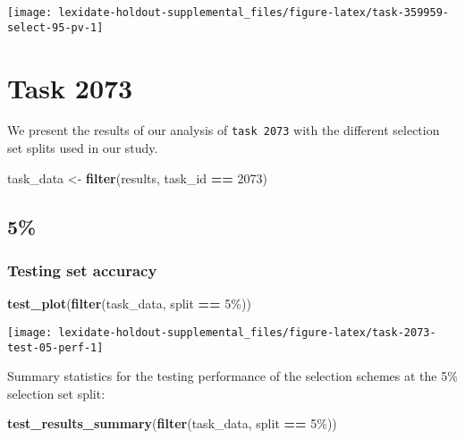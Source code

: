\documentclass[
]{book}
\newenvironment{Shaded}{\begin{snugshade}}{\end{snugshade}}
\newcommand{\DecValTok}[1]{\textcolor[rgb]{0.00,0.00,0.81}{#1}}
\newcommand{\FunctionTok}[1]{\textcolor[rgb]{0.13,0.29,0.53}{\textbf{#1}}}
\newcommand{\NormalTok}[1]{#1}
\newcommand{\OtherTok}[1]{\textcolor[rgb]{0.56,0.35,0.01}{#1}}
\newcommand{\SpecialCharTok}[1]{\textcolor[rgb]{0.81,0.36,0.00}{\textbf{#1}}}
\newcommand{\StringTok}[1]{\textcolor[rgb]{0.31,0.60,0.02}{#1}}
\begin{document}
\texttt{[image: lexidate-holdout-supplemental\_files/figure-latex/task-359959-select-95-pv-1]}

\hypertarget{task-2073}{%
\chapter{Task 2073}\label{task-2073}}

We present the results of our analysis of \texttt{task\ 2073} with the different selection set splits used in our study.

\begin{Shaded}
\begin{Highlighting}[]
\NormalTok{task\_data }\OtherTok{\textless{}{-}} \FunctionTok{filter}\NormalTok{(results, task\_id }\SpecialCharTok{==} \DecValTok{2073}\NormalTok{)}
\end{Highlighting}
\end{Shaded}

\hypertarget{section-40}{%
\section{5\%}\label{section-40}}

\hypertarget{testing-set-accuracy-40}{%
\subsection{Testing set accuracy}\label{testing-set-accuracy-40}}

\begin{Shaded}
\begin{Highlighting}[]
\FunctionTok{test\_plot}\NormalTok{(}\FunctionTok{filter}\NormalTok{(task\_data, split }\SpecialCharTok{==} \StringTok{\textquotesingle{}5\%\textquotesingle{}}\NormalTok{))}
\end{Highlighting}
\end{Shaded}

\texttt{[image: lexidate-holdout-supplemental\_files/figure-latex/task-2073-test-05-perf-1]}

Summary statistics for the testing performance of the selection schemes at the 5\% selection set split:

\begin{Shaded}
\begin{Highlighting}[]
\FunctionTok{test\_results\_summary}\NormalTok{(}\FunctionTok{filter}\NormalTok{(task\_data, split }\SpecialCharTok{==} \StringTok{\textquotesingle{}5\%\textquotesingle{}}\NormalTok{))}
\end{Highlighting}
\end{Shaded}
\end{document}
